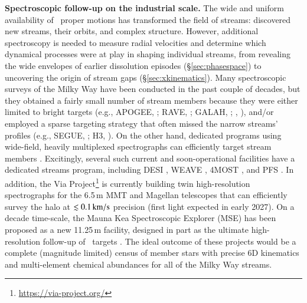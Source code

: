 \documentclass[final,5p,times,twocolumn,authoryear]{elsarticle}
\begin{document}
\textbf{Spectroscopic follow-up on the industrial scale.}
The wide and uniform availability of \gaia\ proper motions has transformed the field of streams: discovered new streams, their orbits, and complex structure.
However, additional spectroscopy is needed to measure radial velocities and determine which dynamical processes were at play in shaping individual streams, from revealing the wide envelopes of earlier dissolution episodes (\S\ref{sec:phasespace}) to uncovering the origin of stream gaps (\S\ref{sec:xkinematics}).
Many spectroscopic surveys of the Milky Way have been conducted in the past couple of decades, but they obtained a fairly small number of stream members because they were either limited to bright targets (e.g., APOGEE, \citealt{majewski:2017}; RAVE, \citealt{steinmetz:2020}; GALAH, \citealt{buder:2021}; \gaia, \citealt{katz:2023}), and/or employed a sparse targeting strategy that often missed the narrow streams' profiles (e.g., SEGUE, \citealt{yanny:2009}; H3, \citealt{conroy:2019}).
On the other hand, dedicated programs using wide-field, heavily multiplexed spectrographs can efficiently target stream members \citep[e.g.,][]{li:2021}.
Excitingly, several such current and soon-operational facilities have a dedicated streams program, including DESI \citep[Dark Energy Spectroscopic Instrument,][]{cooper:2023}, WEAVE \citep[William Herschel Telescope Enhanced Area Velocity Explorer,][]{jin:2023}, 4MOST \citep[4-metre Multi-Object Spectroscopic Telescope,][]{dejong:2019}, and PFS \citep[Prime Focus Spectrograph,][]{takada:2014}.
In addition, the Via Project\footnote{\url{https://via-project.org/}} is currently building twin high-resolution spectrographs for the 6.5\,\unit{m} MMT and Magellan telescopes that can efficiently survey the halo at $\lesssim0.1\,\unit{\kms}$ precision (first light expected in early 2027).
On a decade time-scale, the Mauna Kea Spectroscopic Explorer (MSE) has been proposed as a new 11.25\,\unit{m} facility, designed in part as the ultimate high-resolution follow-up of \gaia\ targets \citep{mse:2019}.
The ideal outcome of these projects would be a complete (magnitude limited) census of member stars with precise 6D kinematics and multi-element chemical abundances for all of the Milky Way streams.
\end{document}
